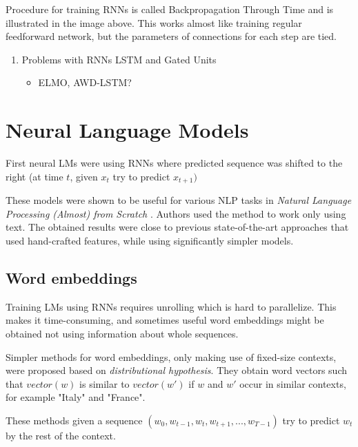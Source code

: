 \documentclass[11pt]{report}
\begin{document}
\let\thefootnote\relax{} 

Procedure for training RNNs is called Backpropagation Through Time and is illustrated in the image above.
This works almost like training regular feedforward network, but the parameters of connections for each step are tied.

\begin{enumerate}
\item\relax [TODO???] Problems with RNNs LSTM and Gated Units


\begin{itemize}
\item ELMO, AWD-LSTM?
\end{itemize}
\end{enumerate}

\section{Neural Language Models}

First neural LMs were using RNNs where predicted sequence was shifted to the right (at time \(t\), given \(x_t\) try to predict \(x_{t+1})\)

These models were shown to be useful for various NLP tasks in \emph{Natural Language Processing (Almost) from Scratch} \cite{nlp_scratch} .
Authors used the method to work only using text.
The obtained results were close to previous state-of-the-art approaches that used hand-crafted features,
while using significantly simpler models.

\subsection{Word embeddings}

Training LMs using RNNs requires unrolling which is hard to parallelize.
This makes it time-consuming, and sometimes useful word embeddings might be obtained not using information about whole sequences.

Simpler methods for word embeddings, only making use of fixed-size contexts, were proposed based on \emph{distributional hypothesis}.
They obtain word vectors such that \(vector(w)\) is similar to \(vector(w')\) if \(w\) and \(w'\) occur in similar contexts, for example "Italy" and "France". 

These methods given a sequence  \((w_0, w_{t-1}, w_t, w_{t+1}, ..., w_{T-1})\) try to predict \(w_t\) by the rest of the context.
\end{document}
